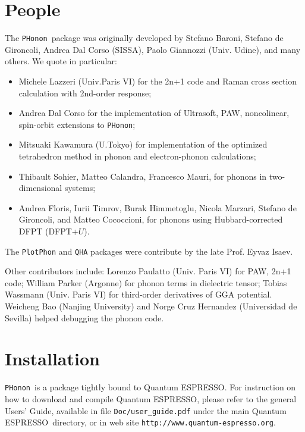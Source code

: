 \documentclass[12pt,a4paper]{article}
\def\qe{{\sc Quantum ESPRESSO}}
\def\PHonon{\texttt{PHonon}}
\begin{document}
\section{People}
The \PHonon\ package
was originally developed by Stefano Baroni, Stefano
de Gironcoli, Andrea Dal Corso (SISSA), Paolo Giannozzi (Univ. Udine), 
and many others.
We quote in particular:
\begin{itemize}
  \item Michele Lazzeri (Univ.Paris VI) for the 2n+1 code and Raman 
  cross section calculation with 2nd-order response;
 \item Andrea Dal Corso for the implementation of Ultrasoft, PAW,
  noncolinear, spin-orbit extensions to \PHonon;
  \item Mitsuaki Kawamura (U.Tokyo) for implementation of the optimized
  tetrahedron method in phonon and electron-phonon calculations;
  \item Thibault Sohier, Matteo Calandra, Francesco Mauri, for 
	phonons in two-dimensional systems;
  \item Andrea Floris, Iurii Timrov, Burak Himmetoglu, Nicola Marzari, 
        Stefano de Gironcoli, and Matteo Cococcioni, for phonons using 
        Hubbard-corrected DFPT (DFPT+$U$).
\end{itemize}

The \texttt{PlotPhon} and \texttt{QHA} packages were contribute by the
late Prof. Eyvaz Isaev.

Other contributors include: Lorenzo Paulatto (Univ. Paris VI) for
PAW, 2n+1 code; William Parker (Argonne) for phonon terms in dielectric
tensor; Tobias Wassmann (Univ. Paris VI) for third-order derivatives of GGA 
potential. Weicheng Bao (Nanjing University) and Norge Cruz Hernandez
(Universidad de Sevilla) helped debugging the phonon code.



\section{Installation}

\PHonon\ is a package tightly bound to \qe.
For instruction on how to download and compile \qe, please refer
to the general Users' Guide, available in file \texttt{Doc/user\_guide.pdf}
under the main \qe\ directory, or in web site
\texttt{http://www.quantum-espresso.org}.
\end{document}
